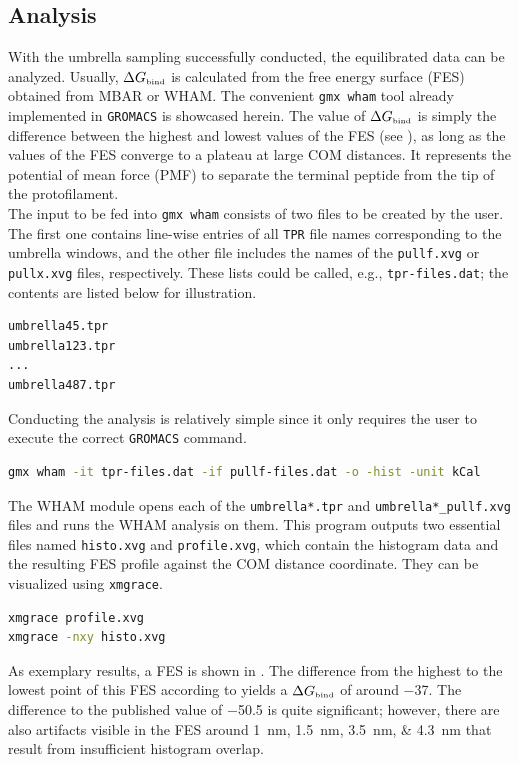 \documentclass[9pt,tutorial]{livecoms}
\newcommand{\code}[1]{\colorbox{light-gray}{\texttt{#1}}}
\begin{document}
\subsection*{Analysis}
With the umbrella sampling successfully conducted, the equilibrated data can be analyzed. Usually, $\Delta G_\text{\tiny bind}$ is calculated from the free energy surface (FES) obtained from MBAR or WHAM. The convenient \code{gmx wham} tool already implemented in \texttt{GROMACS} is showcased herein.\cite{Grossfield_WHAM} The value of $\Delta G_\text{\tiny bind}$ is simply the difference between the highest and lowest values of the FES (see ), as long as the values of the FES converge to a plateau at large COM distances. It represents the potential of mean force (PMF) to separate the terminal peptide from the tip of the protofilament.\\
The input to be fed into \code{gmx wham} consists of two files to be created by the user. The first one contains line-wise entries of all \texttt{TPR} file names corresponding to the umbrella windows, and the other file includes the names of the \code{pullf.xvg} or \code{pullx.xvg} files, respectively. These lists could be called, e.g., \code{tpr-files.dat}; the contents are listed below for illustration.
\begin{lstlisting}[language=bash]
umbrella45.tpr
umbrella123.tpr
...
umbrella487.tpr
\end{lstlisting}
Conducting the analysis is relatively simple since it only requires the user to execute the correct \texttt{GROMACS} command.
\begin{lstlisting}[language=bash]
gmx wham -it tpr-files.dat -if pullf-files.dat -o -hist -unit kCal
\end{lstlisting}
The WHAM module opens each of the \code{umbrella*.tpr} and \code{umbrella*\_pullf.xvg} files and runs the WHAM analysis on them. This program outputs two essential files named \code{histo.xvg} and \code{profile.xvg}, which contain the histogram data and the resulting FES profile against the COM distance coordinate. They can be visualized using \code{xmgrace}.
\begin{lstlisting}[language=bash]
xmgrace profile.xvg
xmgrace -nxy histo.xvg
\end{lstlisting}
As exemplary results, a FES is shown in . The difference from the highest to the lowest point of this FES according to  yields a $\Delta G_\text{\tiny bind}$ of around \SI{-37}{\kcalm}. The difference to the published value of \SI{-50.5}{\kcalm} is quite significant; however, there are also artifacts visible in the FES around \SIlist{1;1.5;3.5;4.3}{\nano\meter} that result from insufficient histogram overlap.
\end{document}

